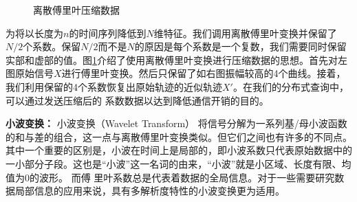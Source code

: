\begin{figure} [t]
	\centering
	\caption{离散傅里叶压缩数据\cite{KeoghDimReduction}}
	\label{fig-chapter2-DFT}
\end{figure}

为将以长度为$n$的时间序列降低到$N$维特征。我们调用离散傅里叶变换并保留了$N/2$个系数。保留$N/2$而不是$N$的原因是每个系数是一个复数，我们需要同时保留实部和虚部的值。图\ref{fig-chapter2-DFT}介绍了使用离散傅里叶变换进行压缩数据的思想。首先对左图原始信号$X$进行傅里叶变换。然后只保留了如右图振幅较高的4个曲线。接着，我们利用保留的4个系数恢复出原始轨迹的近似轨迹$X'$。在我们的分布式查询中，可以通过发送压缩后的 系数数据以达到降低通信开销的目的。

\textbf{小波变换：}
小波变换（Wavelet Transform） 将信号分解为一系列基/母小波函数的和与差的组合，这一点与离散傅里叶变换类似。但它们之间也有许多的不同点。其中一个重要的区别是，小波在时间上是局部的，即小波系数只代表原始数据中的一小部分子段。这也是“小波”这一名词的由来，“小波”就是小区域、长度有限、均值为0的波形。
而傅 里叶系数总是代表着数据的全局信息。对于一些需要研究数据局部信息的应用来说，具有多解析度特性的小波变换更为适用。

